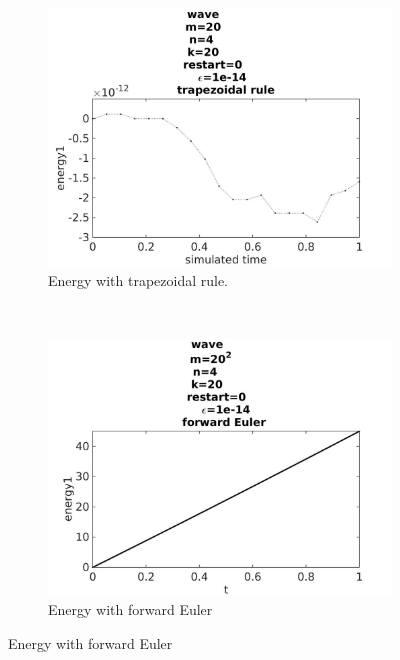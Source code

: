 \begin{figure}[H]
        \centering
        \begin{subfigure}[b]{0.30\textwidth}
                \includegraphics[width=\textwidth]{../MATLAB/fig/energyovertimetrapezoidal.jpg}
                \caption{ Energy with trapezoidal rule. }
                \label{fig:energyovertimetrapezoidal}
        \end{subfigure}%
        ~
        \begin{subfigure}[b]{0.30\textwidth}
                \includegraphics[width=\textwidth]{../MATLAB/fig/energyovertimeeuler.jpg}
                \caption{ Energy with forward Euler }
                \label{fig:energyovertimeeuler}
        \end{subfigure}

\end{figure}
